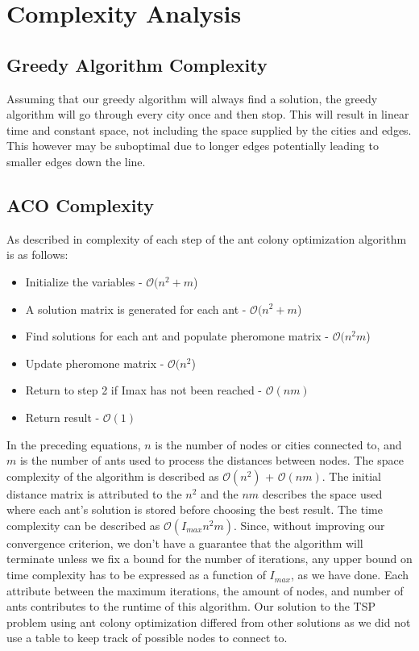 \section{Complexity Analysis}
\subsection*{Greedy Algorithm Complexity}
Assuming that our greedy algorithm will always find a solution, the greedy algorithm will go through
every city once and then stop. This will result in linear time and constant space, not including the
space supplied by the cities and edges. This however may be suboptimal due to longer edges potentially
leading to smaller edges down the line.

\subsection*{ACO Complexity}
As described in \cite{Li2015EfficiencyIO} complexity of each step of the ant colony 
optimization algorithm is as follows: 
\begin{itemize}
  \item Initialize the variables - $\mathcal{O}(n^2 + m$)
  \item A solution matrix is generated for each ant - $\mathcal{O}(n^2 + m$)
  \item Find solutions for each ant and populate pheromone matrix - $\mathcal{O}(n^2m$)
  \item Update pheromone matrix - $\mathcal{O}(n^2$)
  \item Return to step 2 if Imax has not been reached - $\mathcal{O}(nm)$
  \item Return result - $\mathcal{O}(1)$
\end{itemize}

In the preceding equations, $n$ is the number of nodes or cities connected to, and $m$ is the
number of ants used to process the distances between nodes. The space complexity of the algorithm 
is described as $\mathcal{O}(n^2)$ + $\mathcal{O}(nm)$. The initial distance matrix is attributed
to the $n^2$ and the $nm$ describes the space used where each ant's solution is stored before 
choosing the best result. The time complexity can be described as $\mathcal{O}(I_{max}n^2m)$. 
Since, without improving our convergence criterion, we don't have a guarantee that the algorithm
will terminate unless we fix a bound for the number of iterations, any upper bound on time complexity
has to be expressed as a function of $I_{max}$, as we have done. Each attribute between the maximum iterations, the amount of nodes, and number of ants contributes
to the runtime of this algorithm. Our solution to the TSP problem using ant colony optimization
differed from other solutions as we did not use a table to keep track of possible nodes to connect to.

